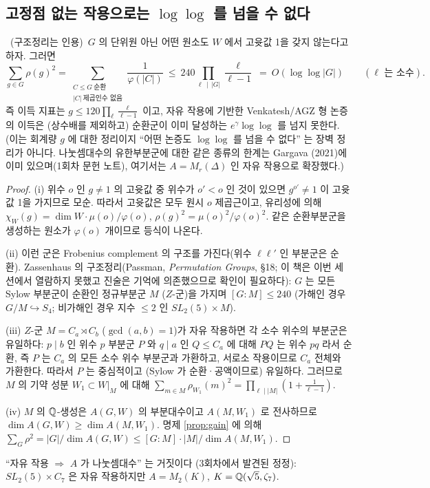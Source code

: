 \subsection{고정점 없는 작용으로는 $\log\log$ 를 넘을 수 없다}
\begin{theorem}[자유 작용의 한계]\label{thm:fpf}\tagP\ (구조정리는 인용)\
$G$ 의 단위원 아닌 어떤 원소도 $W$ 에서 고윳값 1을 갖지 않는다고 하자. 그러면
\[
\sum_{g\in G}\rho(g)^2=\sum_{\substack{C\le G\ \text{순환}\\ |C|\ \text{제곱인수 없음}}}\frac1{\varphi(|C|)}\ \le\ 240\prod_{\ell\,\mid\,|G|}\frac \ell{\ell-1}\ =\ O(\log\log|G|)\qquad(\ell\text{ 는 소수}).
\]
즉 이득 지표는 $g\le120\prod_\ell\tfrac\ell{\ell-1}$ 이고, 자유 작용에 기반한 Venkatesh/AGZ 형 논증의 이득은 (상수배를 제외하고) 순환군이 이미 달성하는 $e^\gamma\log\log$ 를 넘지 못한다. (이는 회계량 $g$ 에 대한 정리이지 ``어떤 논증도 $\log\log$ 를 넘을 수 없다'' 는 장벽 정리가 아니다. 나눗셈대수의 유한부분군에 대한 같은 종류의 한계는 Gargava (2021)에 이미 있으며(1회차 문헌 노트), 여기서는 $A=M_r(\Delta)$ 인 자유 작용으로 확장했다.)
\end{theorem}
\begin{proof}
(i) 위수 $o$ 인 $g\ne1$ 의 고윳값 중 위수가 $o'<o$ 인 것이 있으면 $g^{o'}\neq1$ 이 고윳값 1을 가지므로 모순. 따라서 고윳값은 모두 원시 $o$ 제곱근이고, 유리성에 의해 $\chi_W(g)=\dim W\cdot\mu(o)/\varphi(o)$, $\rho(g)^2=\mu(o)^2/\varphi(o)^2$. 같은 순환부분군을 생성하는 원소가 $\varphi(o)$ 개이므로 등식이 나온다.

(ii) 이런 군은 Frobenius complement 의 구조를 가진다(위수 $\ell\ell'$ 인 부분군은 순환). Zassenhaus 의 구조정리(Passman, \emph{Permutation Groups}, \S18; 이 책은 이번 세션에서 열람하지 못했고 진술은 기억에 의존했으므로 확인이 필요하다): $G$ 는 모든 Sylow 부분군이 순환인 정규부분군 $M$ ($Z$-군)을 가지며 $[G:M]\le 240$ (가해인 경우 $G/M\hookrightarrow S_4$; 비가해인 경우 지수 $\le2$ 인 $SL_2(5)\times M$).

(iii) $Z$-군 $M=C_a\rtimes C_b$ ($\gcd(a,b)=1$)가 자유 작용하면 각 소수 위수의 부분군은 유일하다: $p\mid b$ 인 위수 $p$ 부분군 $P$ 와 $q\mid a$ 인 $Q\le C_a$ 에 대해 $PQ$ 는 위수 $pq$ 라서 순환, 즉 $P$ 는 $C_a$ 의 모든 소수 위수 부분군과 가환하고, 서로소 작용이므로 $C_a$ 전체와 가환한다. 따라서 $P$ 는 중심적이고 (Sylow 가 순환·공액이므로) 유일하다. 그러므로 $M$ 의 기약 성분 $W_1\subset W|_M$ 에 대해 $\sum_{m\in M}\rho_{W_1}(m)^2=\prod_{\ell\mid|M|}(1+\tfrac1{\ell-1})$.

(iv) $M$ 의 $\mathbb{Q}$-생성은 $A(G,W)$ 의 부분대수이고 $A(M,W_1)$ 로 전사하므로 $\dim A(G,W)\ge\dim A(M,W_1)$. 명제 \ref{prop:gain} 에 의해 $\sum_{G}\rho^2=|G|/\dim A(G,W)\le[G:M]\cdot|M|/\dim A(M,W_1)$.
\end{proof}
\begin{remark}
``자유 작용 $\Rightarrow$ $A$ 가 나눗셈대수'' 는 거짓이다 (3회차에서 발견된 정정): $SL_2(5)\times C_7$ 은 자유 작용하지만 $A=M_2(K)$, $K=\mathbb{Q}(\sqrt5,\zeta_7)$.
\end{remark}

